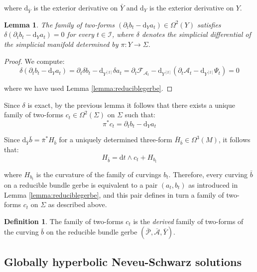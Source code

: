 \documentclass[10pt,reqno,a4paper]{amsart}
\theoremstyle{plain}
\newtheorem{lemma}[thm]{Lemma}
\theoremstyle{definition}
\newtheorem{definition}[thm]{Definition}
\theoremstyle{remark}
\theoremstyle{remark}
\def\dd{\mathrm{d}}
\def\cA{\mathcal{A}}
\def\cI{\mathcal{I}}
\def\cP{\mathcal{P}}
\def\cF{\mathcal{F}}
\renewcommand{\(}{ (}
\renewcommand{\)}{ )}
\begin{document}
\noindent
where $\dd_{\bar{Y}}$ is the exterior derivative on $\bar{Y}$ and $\dd_Y$ is the exterior derivative on $Y$. 

\begin{lemma}
The family of two-forms $(\partial_t b_t - \dd_Y a_t) \in \Omega^2(Y)$ satisfies $\delta (\partial_t b_t - \dd_Y a_t) = 0$ for every $t\in \cI$, where $\delta$ denotes the simplicial differential of the simplicial manifold determined by $\pi \colon Y\to \Sigma$. 
\end{lemma}

\begin{proof}
We compute:
\begin{equation*}
\delta (\partial_t b_t - \dd_Y a_t) = \partial_t \delta b_t - \dd_{Y^{[2]}} \delta a_t =  \partial_t \cF_{\cA_t}- \dd_{Y^{[2]}} (\partial_t \cA_t - \dd_{Y^{[2]}} \Psi_t) = 0
\end{equation*}

\noindent
where we have used Lemma \ref{lemma:reduciblegerbe}.
\end{proof}

\noindent
Since $\delta$ is exact, by the previous lemma it follows that there exists a unique family of two-forms $c_t \in \Omega^2(\Sigma)$ on $\Sigma$ such that:
\begin{equation*}
\pi^{\ast} c_t = \partial_t b_t - \dd_Y a_t
\end{equation*}

\noindent
Since $\dd_{\bar{Y}} \bar{b} = \bar{\pi}^{\ast} H_{\bar{b}}$ for a uniquely determined three-form $\bar{H}_{\bar{b}}\in \Omega^3(M)$, it follows that:
\begin{equation*}
H_{\bar{b}} = \dd t \wedge c_t + H_{b_t}
\end{equation*}

\noindent
where $H_{b_t}$ is the curvature of the family of curvings $b_t$. Therefore, every curving $\bar{b}$ on a reducible bundle gerbe is equivalent to a pair $(a_t , b_t)$ as introduced in Lemma \ref{lemma:reduciblegerbe}, and this pair defines in turn a family of two-forms $c_t$ on $\Sigma$ as described above. 

\begin{definition}
The family of two-forms $c_t$ is the \emph{derived} family of two-forms of the curving $\bar{b}$ on the reducible bundle gerbe $(\bar{\cP},\bar{\cA},\bar{Y})$.
\end{definition} 

%

\subsection{Globally hyperbolic Neveu-Schwarz solutions}
\label{sec:NSNSsystemreduction}
%
\end{document}
